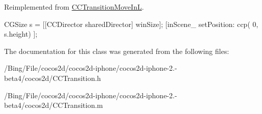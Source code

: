 Reimplemented from \hyperlink{interface_c_c_transition_move_in_l_a0cb17195dedf0a4778ede1324068fdaf}{C\-C\-Transition\-Move\-In\-L}.


\begin{DoxyCode}
{
        CGSize s = [[CCDirector sharedDirector] winSize];
        [inScene_ setPosition: ccp( 0, s.height) ];
}
\end{DoxyCode}


The documentation for this class was generated from the following files\-:\begin{DoxyCompactItemize}
\item 
/\-Bing/\-File/cocos2d/cocos2d-\/iphone/cocos2d-\/iphone-\/2.-\/beta4/cocos2d/C\-C\-Transition.\-h\item 
/\-Bing/\-File/cocos2d/cocos2d-\/iphone/cocos2d-\/iphone-\/2.-\/beta4/cocos2d/C\-C\-Transition.\-m\end{DoxyCompactItemize}
